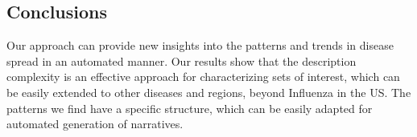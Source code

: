 \subsection*{Conclusions}
Our approach can provide new insights into the patterns and trends
in disease spread in an automated manner.
Our results show that the description complexity is an effective approach for
characterizing sets of interest, which can be easily extended to other
diseases and regions, beyond Influenza in the US.
The patterns we find have a specific
structure, which can be easily adapted for automated generation of narratives.
